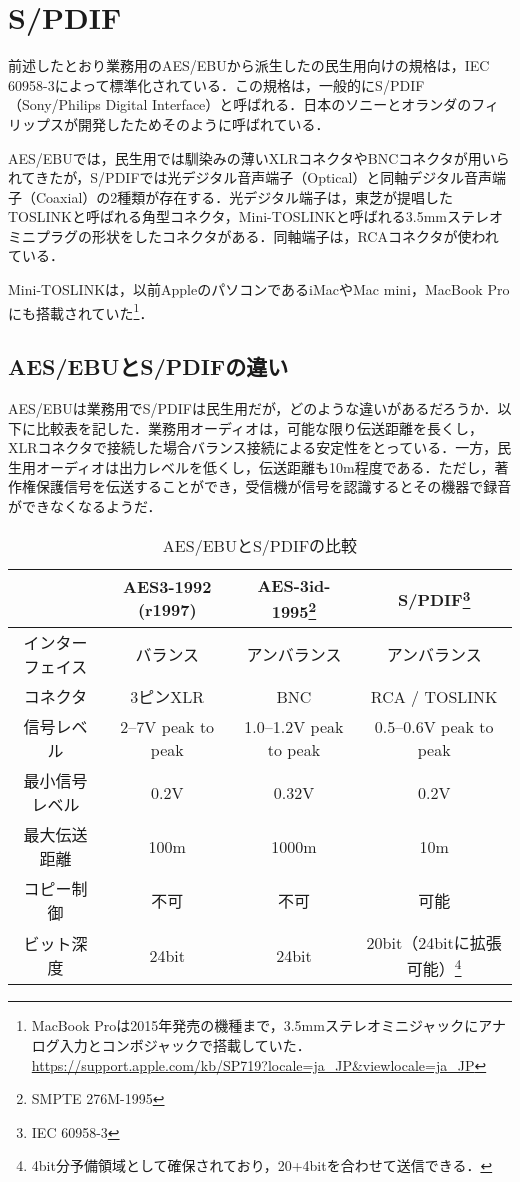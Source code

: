 \section{S/PDIF}

前述したとおり業務用のAES/EBUから派生したの民生用向けの規格は，IEC 60958-3によって標準化されている．この規格は，一般的にS/PDIF（Sony/Philips Digital Interface）と呼ばれる．日本のソニーとオランダのフィリップスが開発したためそのように呼ばれている．

AES/EBUでは，民生用では馴染みの薄いXLRコネクタやBNCコネクタが用いられてきたが，S/PDIFでは光デジタル音声端子（Optical）と同軸デジタル音声端子（Coaxial）の2種類が存在する．光デジタル端子は，東芝が提唱したTOSLINKと呼ばれる角型コネクタ，Mini-TOSLINKと呼ばれる3.5mmステレオミニプラグの形状をしたコネクタがある．同軸端子は，RCAコネクタが使われている．

Mini-TOSLINKは，以前AppleのパソコンであるiMacやMac mini，MacBook Proにも搭載されていた\footnote{MacBook Proは2015年発売の機種まで，3.5mmステレオミニジャックにアナログ入力とコンボジャックで搭載していた． \url{https://support.apple.com/kb/SP719?locale=ja_JP&viewlocale=ja_JP}}．

\subsection{AES/EBUとS/PDIFの違い}

AES/EBUは業務用でS/PDIFは民生用だが，どのような違いがあるだろうか．以下に比較表を記した．業務用オーディオは，可能な限り伝送距離を長くし，XLRコネクタで接続した場合バランス接続による安定性をとっている．一方，民生用オーディオは出力レベルを低くし，伝送距離も10m程度である．ただし，著作権保護信号を伝送することができ，受信機が信号を認識するとその機器で録音ができなくなるようだ．

\begin{table}[htb]
  \begin{center}
    \caption{AES/EBUとS/PDIFの比較\cite{aesebuandspdif}}
    \begin{tabular}{c|ccc} \hline
      & AES3-1992 (r1997) & AES-3id-1995\footnote{SMPTE 276M-1995} & S/PDIF\footnote{IEC 60958-3} \\ \hline \hline
      インターフェイス & バランス & アンバランス & アンバランス \\
      コネクタ & 3ピンXLR & BNC & RCA / TOSLINK \\
      信号レベル & 2--7V peak to peak & 1.0--1.2V peak to peak & 0.5--0.6V peak to peak \\
      最小信号レベル & 0.2V & 0.32V & 0.2V \\
      最大伝送距離 & 100m & 1000m & 10m \\
      コピー制御 & 不可 & 不可 & 可能 \\
      ビット深度 & 24bit & 24bit & 20bit（24bitに拡張可能）\footnote{4bit分予備領域として確保されており，20+4bitを合わせて送信できる．} \\ \hline
    \end{tabular}
  \end{center}
\end{table}

